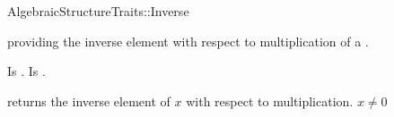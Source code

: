 \begin{ccRefFunctionObjectConcept}{AlgebraicStructureTraits::Inverse}

\ccDefinition

 providing the inverse element with 
respect to multiplication of a . 

\ccRefines 


\ccTypes
{} 
        { Is .}
        { Is .}

\ccOperations
{}
        { returns  the inverse element of $x$ with respect to multiplication. 
          \ccPrecond $x \neq 0$
        }


\ccSeeAlso


\end{ccRefFunctionObjectConcept} 
